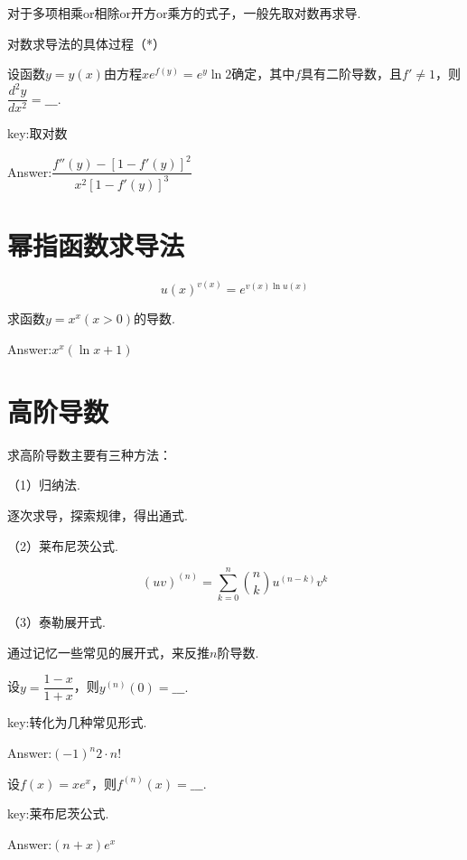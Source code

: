 \documentclass[12pt, a4paper, oneside]{ctexbook}
\begin{document}
对于多项相乘or相除or开方or乘方的式子，一般先取对数再求导.

对数求导法的具体过程（*）

\hspace*{\fill}

设函数$y=y(x)$由方程$xe^{f(y)}=e^y\ln 2$确定，其中$f$具有二阶导数，且$f'\neq 1$，则$\dfrac{d^2 y}{d x^2}=\_\_\_.$

key:取对数

Answer:$\dfrac{f''(y)-[1-f'(y)]^2}{x^2[1-f'(y)]^3}$

\hspace*{\fill}


\section{幂指函数求导法}

\[u(x)^{v(x)}=e^{v(x)\ln u(x)}\]

\hspace*{\fill}

求函数$y=x^x(x>0)$的导数.

Answer:$x^x (\ln x + 1)$

\hspace*{\fill}

\section{高阶导数}

求高阶导数主要有三种方法：

（1）归纳法.

逐次求导，探索规律，得出通式.

（2）莱布尼茨公式.

\[(uv)^{(n)}=\sum_{k=0}^{n} \binom{n}{k}u^{(n-k)}v^{k}\]

（3）泰勒展开式.

通过记忆一些常见的展开式，来反推$n$阶导数.

\hspace*{\fill}

设$y=\dfrac{1-x}{1+x}$，则$y^{(n)}(0)=\_\_\_.$

key:转化为几种常见形式.

Answer:$(-1)^n 2 \cdot n!$

\hspace*{\fill}

设$f(x)=xe^x$，则$f^{(n)}(x)=\_\_\_.$

key:莱布尼茨公式.

Answer:$(n+x)e^x$
\end{document}
